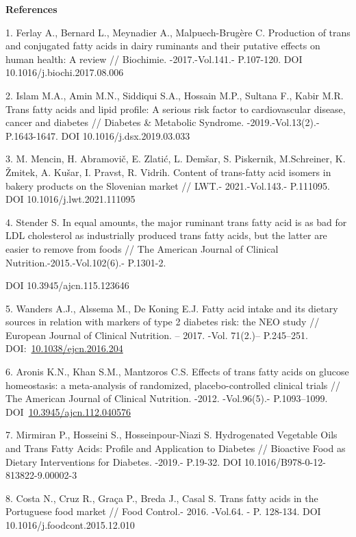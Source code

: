 \begin{center}
{\bfseries References}
\end{center}

\begin{references}
1. Ferlay A., Bernard L., Meynadier A., Malpuech-Brugère C. Production
of trans and conjugated fatty acids in dairy ruminants and their
putative effects on human health: A review // Biochimie.
-2017.-Vol.141.- P.107-120. DOI 10.1016/j.biochi.2017.08.006

2. Islam M.A., Amin M.N., Siddiqui S.A., Hossain M.P., Sultana F., Kabir
M.R. Trans fatty acids and lipid profile: A serious risk factor to
cardiovascular disease, cancer and diabetes // Diabetes \& Metabolic
Syndrome. -2019.-Vol.13(2).- P.1643-1647. DOI 10.1016/j.dsx.2019.03.033

3. M. Mencin, H. Abramovič, E. Zlatić, L. Demšar, S. Piskernik,
M.Schreiner, K. Žmitek, A. Kušar, I. Pravst, R. Vidrih. Content of
trans-fatty acid isomers in bakery products on the Slovenian market //
LWT.- 2021.-Vol.143.- P.111095. DOI 10.1016/j.lwt.2021.111095

4. Stender S. In equal amounts, the major ruminant trans fatty acid is
as bad for LDL cholesterol as industrially produced trans fatty acids,
but the latter are easier to remove from foods // The American Journal
of Clinical Nutrition.-2015.-Vol.102(6).- P.1301-2.

DOI 10.3945/ajcn.115.123646

5. Wanders A.J., Alssema M., De Koning E.J. Fatty acid intake and its
dietary sources in relation with markers of type 2 diabetes risk: the
NEO study // European Journal of Clinical Nutrition. -- 2017. -Vol.
71(2.)-- P.245--251.
DOI:~\href{https://doi.org/10.1038/ejcn.2016.204}{10.1038/ejcn.2016.204}

6. Aronis K.N., Khan S.M., Mantzoros C.S. Effects of trans fatty acids
on glucose homeostasis: a meta-analysis of randomized,
placebo-controlled clinical trials // The American Journal of Clinical
Nutrition. -2012. -Vol.96(5).- P.1093--1099.
DOI~\href{https://doi.org/10.3945/ajcn.112.040576}{10.3945/ajcn.112.040576}

7. Mirmiran P., Hosseini S., Hosseinpour-Niazi S. Hydrogenated Vegetable
Oils and Trans Fatty Acids: Profile and Application to Diabetes //
Bioactive Food as Dietary Interventions for Diabetes. -2019.- P.19-32.
DOI 10.1016/B978-0-12-813822-9.00002-3

8. Costa N., Cruz R., Graça P., Breda J., Casal S. Trans fatty acids in
the Portuguese food market // Food Control.- 2016. -Vol.64. - P.
128-134. DOI 10.1016/j.foodcont.2015.12.010


\end{references}

